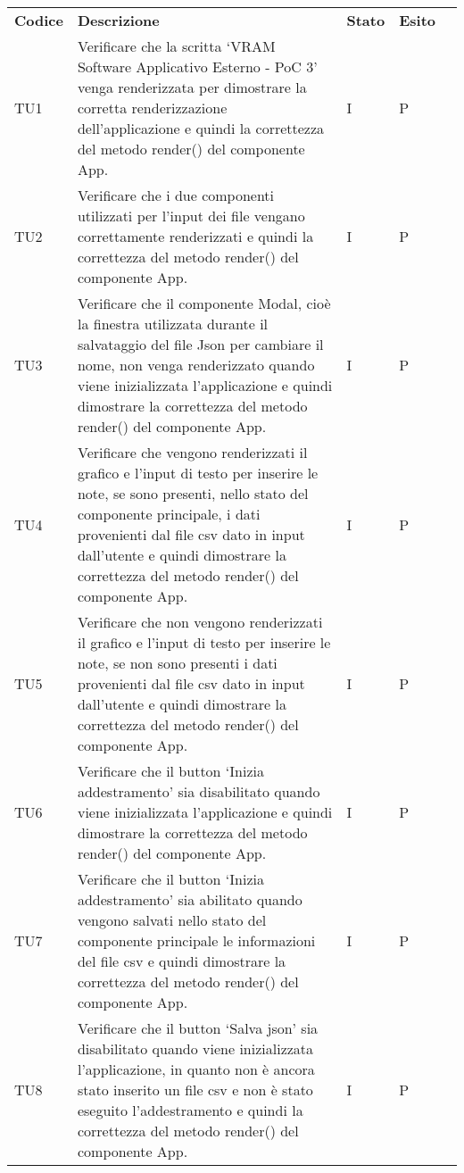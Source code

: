 \begin{longtable} {
		>{}p{15mm} 
		>{}p{79.5mm}
		>{}p{15mm} 
		>{}p{15mm}
		>{}p{0mm}}
	\rowcolor{gray!50}
	\textbf{Codice} & \textbf{Descrizione} & \textbf{Stato} & \textbf{Esito} &\TBstrut \\
	TU1	& Verificare che la scritta ‘VRAM Software Applicativo Esterno - PoC 3’ venga renderizzata per dimostrare la corretta renderizzazione dell’applicazione e quindi la correttezza del metodo render() del componente App. & I & P &\TBstrut \\ [2mm]
	TU2	& Verificare che i due componenti utilizzati per l’input dei file vengano correttamente renderizzati e quindi la correttezza del metodo render() del componente App. & I & P &\TBstrut \\ [2mm]
	TU3	& Verificare che il componente Modal, cioè la finestra utilizzata durante il salvataggio del file Json per cambiare il nome, non venga renderizzato quando viene inizializzata l’applicazione e quindi dimostrare la correttezza del metodo render() del componente App. & I & P &\TBstrut \\ [2mm]
	TU4	& Verificare che vengono renderizzati il grafico e l’input di testo per inserire le note, se sono presenti, nello stato del componente principale, i dati provenienti dal file csv dato in input dall’utente e quindi dimostrare la correttezza del metodo render() del componente App. & I & P &\TBstrut \\ [2mm]
	TU5	& Verificare che non vengono renderizzati il grafico e l’input di testo per inserire le note, se non sono presenti i dati provenienti dal file csv dato in input dall’utente e quindi dimostrare la correttezza del metodo render() del componente App. & I & P &\TBstrut \\ [2mm]
	TU6	& Verificare che il button ‘Inizia addestramento’ sia disabilitato quando viene inizializzata l’applicazione e quindi dimostrare la correttezza del metodo render() del componente App. & I & P &\TBstrut \\ [2mm]
	TU7	& Verificare che il button ‘Inizia addestramento’ sia abilitato quando vengono salvati nello stato del componente principale le informazioni del file csv e quindi dimostrare la correttezza del metodo render() del componente App. & I & P &\TBstrut \\ [2mm]
	TU8	& Verificare che il button ‘Salva json’ sia disabilitato quando viene inizializzata l’applicazione, in quanto non è ancora stato inserito un file csv e non è stato eseguito l’addestramento e quindi la correttezza del metodo render() del componente App. & I & P &\TBstrut \\ [2mm]

\end{longtable}
